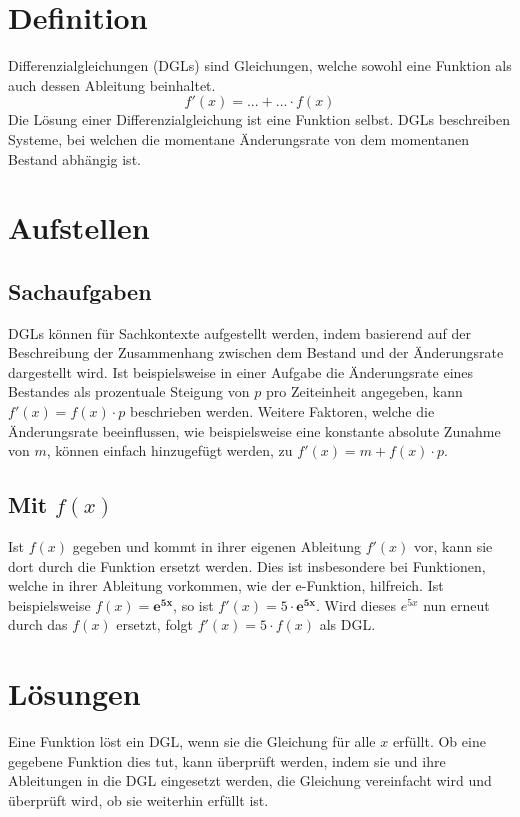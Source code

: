 \documentclass{article}
\begin{document}
\section{Definition} 
Differenzialgleichungen (DGLs) sind Gleichungen, welche sowohl eine Funktion als auch dessen Ableitung beinhaltet.
\[
 f'(x) = ... + ... \cdot f(x)
\]
Die Lösung einer Differenzialgleichung ist eine Funktion selbst. DGLs beschreiben Systeme, bei welchen die momentane Änderungsrate von dem momentanen Bestand abhängig ist.
 

\section{Aufstellen}
\subsection{Sachaufgaben} 
DGLs können für Sachkontexte aufgestellt werden, indem basierend auf der Beschreibung der Zusammenhang zwischen dem Bestand und der Änderungsrate dargestellt wird. \newline
Ist beispielsweise in einer Aufgabe die Änderungsrate eines Bestandes als prozentuale Steigung von $p$ pro Zeiteinheit angegeben, kann $f'(x) = f(x) \cdot p$ beschrieben werden. Weitere Faktoren, welche die Änderungsrate beeinflussen, wie beispielsweise eine konstante absolute Zunahme von $m$, können einfach hinzugefügt werden, zu $f'(x)=m + f(x) \cdot p$.
 
\subsection{Mit $f(x)$} 
Ist $f(x)$ gegeben und kommt in ihrer eigenen Ableitung $f'(x)$ vor, kann sie dort durch die Funktion ersetzt werden. Dies ist insbesondere bei Funktionen, welche in ihrer Ableitung vorkommen, wie der e-Funktion, hilfreich. \newline
Ist beispielsweise $f(x)=\mathbf{e^{5x}}$, so ist $f'(x)=5 \cdot \mathbf{e^{5x}}$. Wird dieses $e^{5x}$ nun erneut durch das $f(x)$ ersetzt, folgt $f'(x)=5 \cdot f(x)$ als DGL.
 
\section{Lösungen} 
Eine Funktion löst ein DGL, wenn sie die Gleichung für alle $x$ erfüllt. 
Ob eine gegebene Funktion dies tut, kann überprüft werden, indem sie und ihre Ableitungen in die DGL eingesetzt werden, die Gleichung vereinfacht wird und überprüft wird, ob sie weiterhin erfüllt ist.
\end{document}
